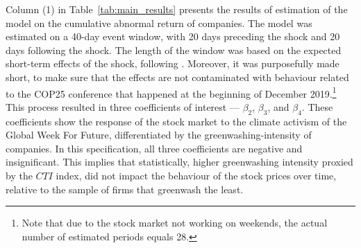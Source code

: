 \documentclass[12pt]{article}
\begin{document}
Column (1) in Table~\ref{tab:main_results} presents the results of estimation of the model on the cumulative abnormal return of companies. The model was estimated on a 40-day event window, with 20 days preceding the shock and 20 days following the shock. The length of the window was based on the expected short-term effects of the shock, following \textcite{schusterStockPriceReactions2023}. Moreover, it was purposefully made short, to make sure that the effects are not contaminated with behaviour related to the COP25 conference that happened at the beginning of December 2019.\footnote{Note that due to the stock market not working on weekends, the actual number of estimated periods equals 28.} This process resulted in three coefficients of interest --- $\beta_2$, $\beta_3$, and $\beta_4$. These coefficients show the response of the stock market to the climate activism of the Global Week For Future, differentiated by the greenwashing-intensity of companies. In this specification, all three coefficients are negative and insignificant. This implies that statistically, higher greenwashing intensity proxied by the $CTI$ index, did not impact the behaviour of the stock prices over time, relative to the sample of firms that greenwash the least. 
\end{document}

